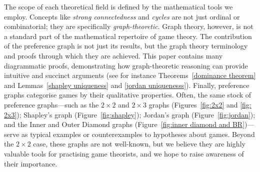 \documentclass[preprint,authoryear]{elsarticle}
\begin{document}
The scope of each theoretical field is defined by the mathematical tools we employ. Concepts like \emph{strong connectedness} and \emph{cycles} are not just ordinal or combinatorial; they are specifically \emph{graph-theoretic}. %
Graph theory, however, is not a standard part of the mathematical repertoire of game theory. The contribution of the preference graph is not just its results, but the graph theory terminology and proofs through which they are achieved. This paper contains many diagrammatic proofs, demonstrating how graph-theoretic reasoning can provide intuitive and succinct arguments (see for instance Theorems~\ref{dominance theorem} and Lemmas~\ref{shapley uniqueness} and \ref{jordan uniquenesss}). Finally, preference graphs categorise games by their qualitative properties. Often, the same stock of preference graphs---such as the $2\times 2$ and $2\times 3$ graphs (Figures~\ref{fig:2x2} and \ref{fig: 2x3}); Shapley's graph (Figure~\ref{fig:shapley}); Jordan's graph (Figure~\ref{fig:jordan}); and the Inner and Outer Diamond graphs (Figure~\ref{fig:inner diamond and BR})---serve as typical examples or counterexamples to hypotheses about games. Beyond the $2\times 2$ case, these graphs are not well-known, but we believe they are highly valuable tools for practising game theorists, and we hope to raise awareness of their importance.
\end{document}

